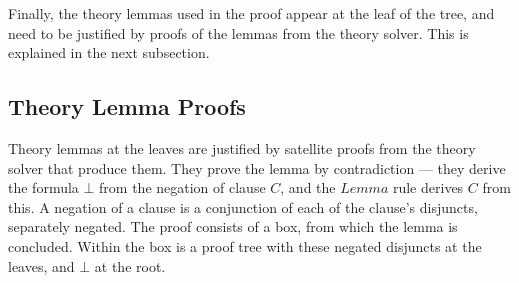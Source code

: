 \documentclass[11pt]{article}
\begin{document}
	Finally, the theory lemmas used
	in the proof appear at the leaf
	of the tree, and need to be justified 
	by proofs of the lemmas from 
	the theory solver. This is explained in 
	the next subsection.
	
	\subsection{Theory Lemma Proofs}
	\label{sec:thproof}
	Theory lemmas at the leaves are 
	justified by satellite proofs 
	from the theory solver that produce 
	them. They prove the lemma 
	by contradiction --- they derive
	the formula $\bot$ from the 
	negation of clause $C$, and the 
	$\mathit{Lemma}$ rule derives $C$
	from this. A negation of a clause
	is a conjunction of each of the 
	clause's disjuncts, 
	separately negated. The proof 
	consists of a box, from which the 
	lemma is concluded. Within the box
	is a proof tree with these negated 
	disjuncts at the leaves, and $\bot$
	at the root. 
	
\end{document}
